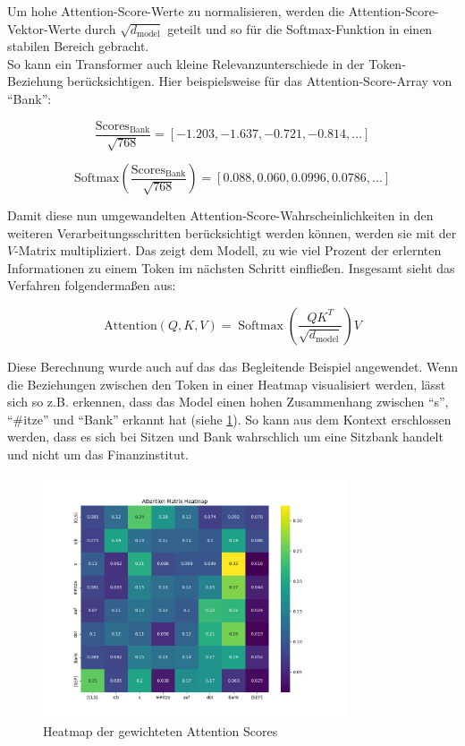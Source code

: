 Um hohe Attention-Score-Werte zu normalisieren, werden die Attention-Score-Vektor-Werte durch \( \sqrt{d_{\text{model}}} \) geteilt und so für die Softmax-Funktion in einen stabilen Bereich gebracht. \\
So kann ein Transformer auch kleine Relevanzunterschiede in der Token-Beziehung berücksichtigen.
Hier beispielsweise für das Attention-Score-Array von \enquote{Bank}:

\[
\frac{\text{Scores}_{\text{Bank}}}{\sqrt{768}} = [-1.203, -1.637, -0.721, -0.814, \dots]
\]

\[
\text{Softmax}\left(\frac{\text{Scores}_{\text{Bank}}}{\sqrt{768}}\right) = [0.088, 0.060, 0.0996, 0.0786, \dots]
\]

Damit diese nun umgewandelten Attention-Score-Wahrscheinlichkeiten in den weiteren Verarbeitungsschritten berücksichtigt werden können, werden sie mit der \( V \)-Matrix multipliziert. 
Das zeigt dem Modell, zu wie viel Prozent der erlernten Informationen zu einem Token im nächsten Schritt einfließen.
Insgesamt sieht das Verfahren folgendermaßen aus:

\[
\text{Attention}(Q, K, V) = \operatorname{Softmax}\left(\frac{QK^T}{\sqrt{d_{\text{model}}}}\right) V
\]

Diese Berechnung wurde auch auf das das Begleitende Beispiel angewendet.
Wenn die Beziehungen zwischen den Token in einer Heatmap visualisiert werden, lässt sich so z.B. erkennen, dass das Model einen hohen Zusammenhang zwischen \enquote{s}, \enquote{#itze} und \enquote{Bank} erkannt hat (siehe \ref{fig:heatmap}). 
So kann aus dem Kontext erschlossen werden, dass es sich bei Sitzen und Bank wahrschlich um eine Sitzbank handelt und nicht um das Finanzinstitut.

\begin{figure}[ht]
	\centering
	\includegraphics[width=0.8\textwidth]{Bilder/attention_matrix_heatmap.png} 
	\caption{Heatmap der gewichteten Attention Scores}
	\label{fig:heatmap}
\end{figure}

